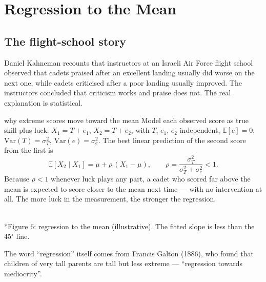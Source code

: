 \documentclass[11pt]{article}
\begin{document}
\section{Regression to the Mean}
\subsection{The flight-school story}
Daniel Kahneman recounts that instructors at an Israeli Air Force flight school observed that cadets praised after an excellent landing usually did worse on the next one, while cadets criticised after a poor landing usually improved. The instructors concluded that criticism works and praise does not. The real explanation is statistical.

\begin{derivation}{why extreme scores move toward the mean}
Model each observed score as true skill plus luck: $X_1=T+e_1$, $X_2=T+e_2$, with $T$, $e_1$, $e_2$ independent, $\mathbb E[e]=0$, $\text{Var}(T)=\sigma_T^2$, $\text{Var}(e)=\sigma_e^2$. The best linear prediction of the second score from the first is
\[\mathbb E[X_2\mid X_1]=\mu+\rho\,(X_1-\mu),\qquad \rho=\frac{\sigma_T^2}{\sigma_T^2+\sigma_e^2}<1.\]
Because $\rho<1$ whenever luck plays any part, a cadet who scored far above the mean is expected to score closer to the mean next time --- with no intervention at all. The more luck in the measurement, the stronger the regression.
\end{derivation}

\begin{center}\\*{\small\color{GreyN}Figure 6: regression to the mean (illustrative). The fitted slope is less than the 45$^\circ$ line.}\end{center}

The word ``regression'' itself comes from Francis Galton (1886), who found that children of very tall parents are tall but less extreme --- ``regression towards mediocrity''.
\end{document}
